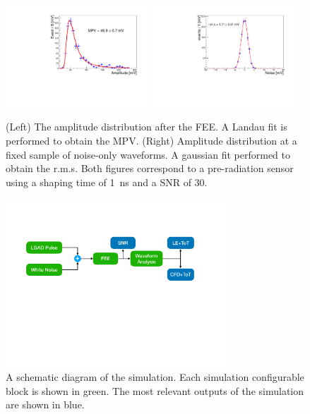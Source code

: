 \documentclass[preprint,1p]{elsarticle}
\begin{document}
\begin{figure}[htbp]
  \centering
  \includegraphics[width=0.48\textwidth]{figs/amplitude_1ns_landau_fit.pdf} \hfill
  \includegraphics[width=0.48\textwidth]{figs/noise_plot_snr30.pdf}
  \caption{(Left) The amplitude distribution after the FEE. A Landau fit is performed to obtain the MPV.
  (Right) Amplitude distribution at a fixed sample of noise-only waveforms. A gaussian fit performed to obtain the r.m.s.
  Both figures correspond to a pre-radiation sensor using a shaping time of 1~\si{ns} and a SNR of 30.}
  \label{fig:amp_and_noise}
\end{figure}

\begin{figure}[htbp]
\centering
\includegraphics[width=0.75\textwidth]{figs/lgad_simulation_diagram.pdf}
\caption{A schematic diagram of the simulation. Each simulation configurable
	block is shown in green. The most relevant outputs of the simulation are shown
	in blue.} \label{fig:simulation_diagram}
\end{figure}
\end{document}
